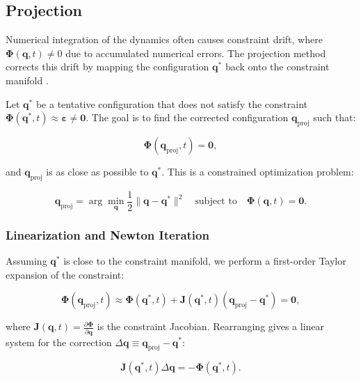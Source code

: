 \documentclass{article}
\begin{document}
\subsection{Projection}

Numerical integration of the dynamics often causes constraint drift, where \(
\bm{\Phi}(\bm{q}, t) \neq 0 \) due to accumulated numerical errors. The
projection method corrects this drift by mapping the configuration \( \bm{q}^*
\) back onto the constraint manifold \cite{bib:cline2002rigid}.

Let \( \bm{q}^* \) be a tentative configuration that does not satisfy the
constraint \( \bm{\Phi}(\bm{q}^*, t) \approx \bm{\varepsilon} \neq \bm{0} \).
The goal is to find the corrected configuration \( \bm{q}_{\text{proj}} \) such
that:

\begin{equation}
    \bm{\Phi}(\bm{q}_{\text{proj}}, t) = \bm{0},
\end{equation}

and \( \bm{q}_{\text{proj}} \) is as close as possible to \( \bm{q}^* \). This
is a constrained optimization problem:

\begin{equation}
    \bm{q}_{\text{proj}} = \arg\min_{\bm{q}} \frac{1}{2} \| \bm{q} - \bm{q}^* \|^2 \quad \text{subject to} \quad \bm{\Phi}(\bm{q}, t) = \bm{0}.
\end{equation}

\subsubsection*{Linearization and Newton Iteration}

Assuming \( \bm{q}^* \) is close to the constraint manifold, we perform a
first-order Taylor expansion of the constraint:

\begin{equation}
    \bm{\Phi}(\bm{q}_{\text{proj}}, t) \approx \bm{\Phi}(\bm{q}^*, t) + \bm{J}(\bm{q}^*, t)(\bm{q}_{\text{proj}} - \bm{q}^*) = \bm{0},
\end{equation}

where \( \bm{J}(\bm{q}, t) = \frac{\partial \bm{\Phi}}{\partial \bm{q}} \) is
the constraint Jacobian. Rearranging gives a linear system for the correction \(
\Delta \bm{q} \equiv \bm{q}_{\text{proj}} - \bm{q}^* \):

\begin{equation}
    \bm{J}(\bm{q}^*, t) \Delta \bm{q} = -\bm{\Phi}(\bm{q}^*, t).
\end{equation}
\end{document}
